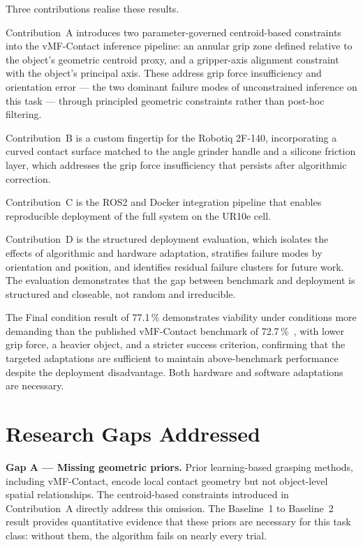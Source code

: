 \documentclass[12pt, a4paper]{report}
\begin{document}
Three contributions realise these results. 

Contribution~A introduces two parameter-governed centroid-based constraints into the vMF-Contact inference pipeline: an annular grip zone defined relative to the object's geometric centroid proxy, and a gripper-axis alignment constraint with the object's principal axis. These address grip force insufficiency and orientation error --- the two dominant failure modes of unconstrained inference on this task --- through principled geometric constraints rather than post-hoc filtering.

Contribution~B is a custom fingertip for the Robotiq 2F-140, incorporating a curved contact surface matched to the angle grinder handle and a silicone friction layer, which addresses the grip force insufficiency that persists after algorithmic correction. 
 
Contribution~C is the ROS2 and Docker integration pipeline that enables reproducible deployment of the full system on the UR10e cell.

Contribution~D is the structured deployment evaluation, which isolates the effects of algorithmic and hardware adaptation, stratifies failure modes by orientation and position, and identifies residual failure clusters for future work. The evaluation demonstrates that the gap between benchmark and deployment is structured and closeable, not random and irreducible.

The Final condition result of 77.1\,\% demonstrates viability under conditions more demanding than the published vMF-Contact benchmark of 72.7\,\%~\cite{shi2025}, with lower grip force, a heavier object, and a stricter success criterion, confirming that the targeted adaptations are sufficient to maintain above-benchmark performance despite the deployment disadvantage. Both hardware and software adaptations are necessary.

\section{Research Gaps Addressed}

\textbf{Gap A --- Missing geometric priors.} Prior learning-based grasping methods, including vMF-Contact, encode local contact geometry but not object-level spatial relationships. The centroid-based constraints introduced in Contribution~A directly address this omission. The Baseline~1 to Baseline~2 result provides quantitative evidence that these priors are necessary for this task class: without them, the algorithm fails on nearly every trial.
\end{document}
